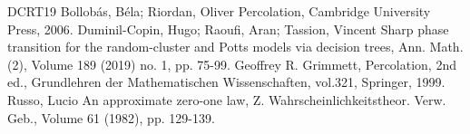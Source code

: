 \begin{thebibliography}{DCRT19}
 Bollobás, Béla; Riordan, Oliver Percolation, Cambridge University Press, 2006.
 Duminil-Copin, Hugo; Raoufi, Aran; Tassion, Vincent Sharp phase transition for the random-cluster and Potts models via decision trees, Ann. Math. (2), Volume 189 (2019) no. 1, pp. 75-99.
 Geoffrey R. Grimmett, Percolation, 2nd ed., Grundlehren der Mathematischen Wissenschaften, vol.321, Springer, 1999.
 Russo, Lucio An approximate zero-one law, Z. Wahrscheinlichkeitstheor. Verw. Geb., Volume 61 (1982), pp. 129-139.
\end{thebibliography}
